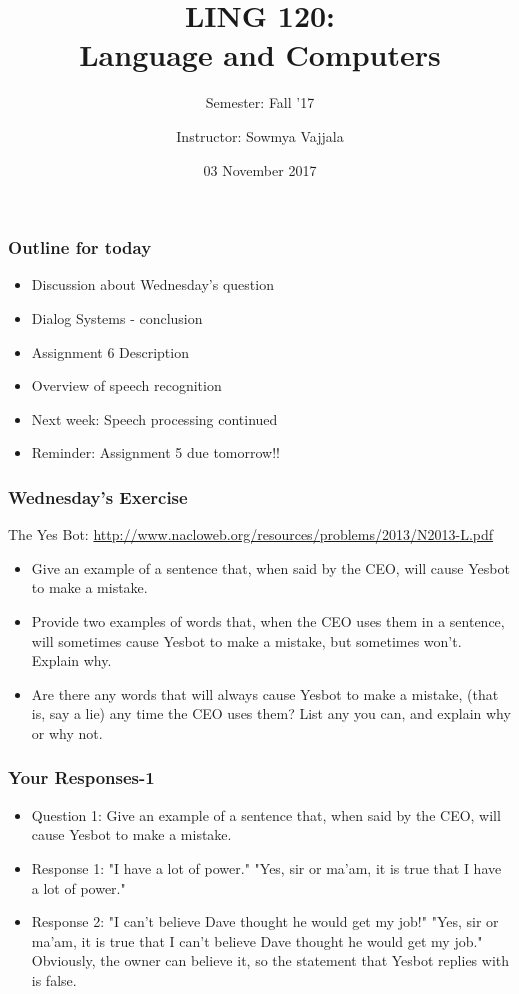 \documentclass{beamer}
\author[Sowmya Vajjala]{Instructor: Sowmya Vajjala}
\title[LING 120]{LING 120: \\ Language and Computers}
\subtitle{Semester: Fall '17}
\date{03 November 2017}
\institute{Iowa State University, USA}
\begin{document}
\begin{frame}\titlepage
\end{frame}

\begin{frame}
\frametitle{Outline for today}
\begin{itemize}
\item Discussion about Wednesday's question
\item Dialog Systems - conclusion
\item Assignment 6 Description
\item Overview of speech recognition
\item Next week: Speech processing continued
\item Reminder: Assignment 5 due tomorrow!!
\end{itemize}	
\end{frame}

\begin{frame}
\frametitle{Wednesday's Exercise}
The Yes Bot: \url{http://www.nacloweb.org/resources/problems/2013/N2013-L.pdf}
\begin{itemize}
\item Give an example of a sentence that, when said by the CEO, will cause Yesbot to make a mistake.
\item Provide two examples of words that, when the CEO uses them in a sentence, will sometimes cause
Yesbot to make a mistake, but sometimes won’t. Explain why.
\item Are there any words that will always cause Yesbot to make a mistake, (that is, say a lie) any time the
CEO uses them? List any you can, and explain why or why not.
\end{itemize}
\end{frame}

\begin{frame}
\frametitle{Your Responses-1}
\begin{itemize}
\item Question 1: Give an example of a sentence that, when said by the CEO, will cause Yesbot to make a mistake.
\item Response 1: "I have a lot of power." "Yes, sir or ma'am, it is true that I have a lot of power."
\item Response 2: "I can't believe Dave thought he would get my job!" "Yes, sir or ma'am, it is true that I can't believe Dave thought he would get my job." Obviously, the owner can believe it, so the statement that Yesbot replies with is false.
\end{itemize}
\end{frame}
\end{document}
